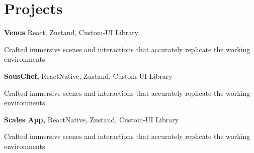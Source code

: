 
\newenvironment{twocolentry_proj}[2][]{
    \onecolentry
    \def\secondColumn{#2}
    \setcolumnwidth{\fill, 7 cm}
    \begin{paracol}{2}
}{
    \switchcolumn \raggedleft \secondColumn
    \end{paracol}
    \endonecolentry
} %

\vspace{5 pt - 0.5 cm}
\section{Projects}
\begin{twocolentry_proj}{
    \mbox{}%
}
\textbf{Venus} React, Zustand, Custom-UI Library  
\end{twocolentry_proj}

\begin{onecolentry}
    \begin{highlights}
        \item Crafted immersive scenes and interactions that accurately replicate the working environments
    \end{highlights}
\end{onecolentry}

\vspace{0.10 cm}
\begin{twocolentry_proj}{
    \mbox{}%
}
\textbf{SousChef,} ReactNative, Zustand, Custom-UI Library  
\end{twocolentry_proj}
\begin{onecolentry}
    \begin{highlights}
        \item Crafted immersive scenes and interactions that accurately replicate the working environments
    \end{highlights}
\end{onecolentry}

\vspace{0.10 cm}
\begin{twocolentry_proj}{
    \mbox{}%
}
\textbf{Scales App,} ReactNative, Zustand, Custom-UI Library  
\end{twocolentry_proj}
\begin{onecolentry}
    \begin{highlights}
        \item Crafted immersive scenes and interactions that accurately replicate the working environments
    \end{highlights}
\end{onecolentry}